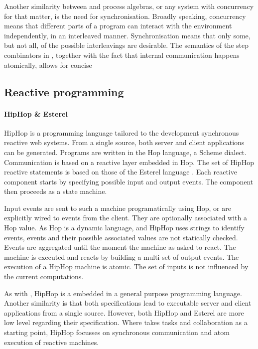 Another similarity between \TOPHAT and process algebras, or any system with concurrency for that matter, is the need for synchronisation.
Broadly speaking, concurrency means that different parts of a program can interact with the environment independently, in an interleaved manner.
Synchronisation means that only some, but not all, of the possible interleavings are desirable.
The semantics of the step combinators in \TOPHAT, together with the fact that internal communication happens atomically, allows for concise 



\subsection{Reactive programming}

\paragraph{HipHop \& Esterel}

HipHop \cite{berry2011hiphop} is a programming language tailored to the development synchronous reactive web systems.
From a single source, both server and client applications can be generated.
Programs are written in the Hop language, a Scheme dialect.
Communication is based on a reactive layer embedded in Hop.
The set of HipHop reactive statements is based on those of the Esterel language \cite{boussinot1991esterel}.
Each reactive component starts by specifying possible input and output events.
The component then proceeds as a state machine.

Input events are sent to such a machine programatically using Hop, or are explicitly wired to events from the client.
They are optionally associated with a Hop value.
As Hop is a dynamic language, and HipHop uses strings to identify events, events and their possible associated values are not statically checked.
Events are aggregated until the moment the machine as asked to react.
The machine is executed and reacts by building a multi-set of output events.
The execution of a HipHop machine is atomic.
The set of inputs is not influenced by the current computations.

As with \TOPHAT, HipHop is a \DSL embedded in a general purpose programming language.
Another similarity is that both specifications lead to executable server and client applications from a single source.
However, both HipHop and Esterel are more low level regarding their specification.
Where \TOPHAT takes tasks and collaboration as a starting point,
HipHop focusses on synchronous communication and atom execution of reactive machines.


